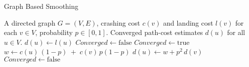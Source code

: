 \begin{algorithm}[htbp]
  \caption{Graph Based Smoothing}
  \label{alg:flow}
  \begin{algorithmic}[1]
    \Require A directed graph \(G=(V,E)\), crashing cost \(c(v)\) and landing cost \(l(v)\) for each \(v\in V\), probability \(p\in[0,1]\).
    \Ensure Converged path-cost estimates \(d(u)\) for all \(u\in V\).
      \State \(d(u)\gets l(u)\) 
    \EndFor
    \State \(\mathit{Converged}\gets \text{false}\)
      \State \(\mathit{Converged}\gets \text{true}\)
        \State \(w \gets c(u)\,(1-p)\;+\;c(v)\,p(1-p)\) 
          \State \(d(u)\gets w + p^2\,d(v)\)
          \State \(\mathit{Converged}\gets \text{false}\)
        \EndIf
      \EndFor
    \EndWhile
  \end{algorithmic}
\end{algorithm}